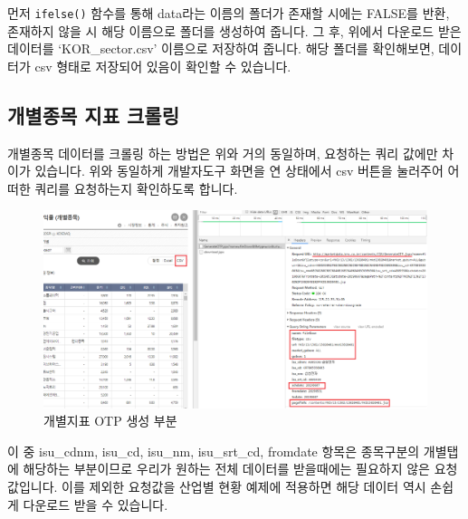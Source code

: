 \documentclass[]{book}
\begin{document}
먼저 \texttt{ifelse()} 함수를 통해 data라는 이름의 폴더가 존재할 시에는 FALSE를 반환, 존재하지 않을 시 해당 이름으로 폴더를 생성하여 줍니다. 그 후, 위에서 다운로드 받은 데이터를 `KOR\_sector.csv' 이름으로 저장하여 줍니다. 해당 폴더를 확인해보면, 데이터가 csv 형태로 저장되어 있음이 확인할 수 있습니다.

\hypertarget{section-20}{%
\subsection{개별종목 지표 크롤링}\label{section-20}}

개별종목 데이터를 크롤링 하는 방법은 위와 거의 동일하며, 요청하는 쿼리 값에만 차이가 있습니다. 위와 동일하게 개발자도구 화면을 연 상태에서 csv 버튼을 눌러주어 어떠한 쿼리를 요청하는지 확인하도록 합니다.

\begin{figure}

{\centering \includegraphics[width=1\linewidth]{images/crawl_practice_krx_ind} 

}

\caption{개별지표 OTP 생성 부분}\label{fig:unnamed-chunk-8}
\end{figure}

이 중 isu\_cdnm, isu\_cd, isu\_nm, isu\_srt\_cd, fromdate 항목은 종목구분의 개별탭에 해당하는 부분이므로 우리가 원하는 전체 데이터를 받을때에는 필요하지 않은 요청값입니다. 이를 제외한 요청값을 산업별 현황 예제에 적용하면 해당 데이터 역시 손쉽게 다운로드 받을 수 있습니다.
\end{document}
